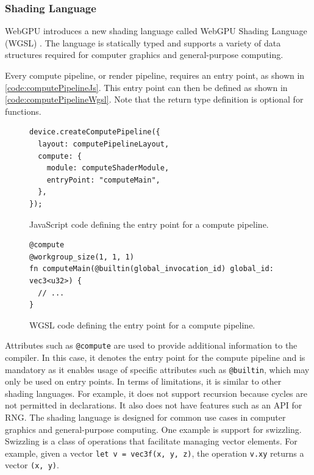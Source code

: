 \subsubsection{Shading Language}

\gls{WebGPU} introduces a new shading language called \gls{WebGPU} Shading Language (\gls{WGSL}) \cite{wgslSpecification}. The language is statically typed and supports a variety of data structures required for computer graphics and general-purpose computing.

Every compute pipeline, or render pipeline, requires an entry point, as shown in \autoref{code:computePipelineJs}. This entry point can then be defined as shown in \autoref{code:computePipelineWgsl}. Note that the return type definition is optional for functions.

\begin{figure}[H]
  \begin{lstlisting}[style=JavaScript]
device.createComputePipeline({
  layout: computePipelineLayout,
  compute: {
    module: computeShaderModule,
    entryPoint: "computeMain",
  },
});
  \end{lstlisting}
  \caption{JavaScript code defining the entry point for a compute pipeline.}
  \label{code:computePipelineJs}
\end{figure}

\begin{figure}[H]
  \begin{lstlisting}[style=wgsl]
@compute
@workgroup_size(1, 1, 1)
fn computeMain(@builtin(global_invocation_id) global_id: vec3<u32>) {
  // ...
}
  \end{lstlisting}
  \caption{\gls{WGSL} code defining the entry point for a compute pipeline.}
  \label{code:computePipelineWgsl}
\end{figure}

Attributes such as \texttt{@compute} are used to provide additional information to the compiler. In this case, it denotes the entry point for the compute pipeline and is mandatory as it enables usage of specific attributes such as \texttt{@builtin}, which may only be used on entry points.
In terms of limitations, it is similar to other shading languages. For example, it does not support recursion because cycles are not permitted in declarations. It also does not have features such as an \gls{API} for \gls{RNG}. The shading language is designed for common use cases in computer graphics and general-purpose computing. One example is support for swizzling. Swizzling is a class of operations that facilitate managing vector elements. For example, given a vector \texttt{let v = vec3f(x, y, z)}, the operation \texttt{v.xy} returns a vector \texttt{(x, y)}.

